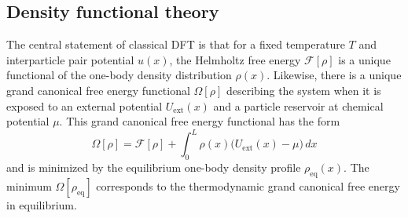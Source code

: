 \documentclass[aps,pre,twocolumn,superscriptaddress,nofootinbib]{revtex4}
\begin{document}
\subsection{Density functional theory}
The central statement of classical DFT is that for a fixed temperature $T$ and interparticle pair potential $u(x)$, the Helmholtz free energy $\mathcal{F}[\rho]$ is a unique functional of the one-body density distribution $\rho(x)$. 
Likewise, there is a unique grand canonical free energy functional $\Omega[\rho]$ describing the system when it is exposed to an external potential $U_\textrm{ext}(x)$ and a particle reservoir at chemical potential $\mu$.
This grand canonical free energy functional has the form \cite{Tarazona2008_incollection}
%
\begin{equation}
	\Omega[\rho] = \mathcal{F}[\rho] + \int_0^L \rho(x) \big( U_\textrm{ext}(x) - \mu \big) \, dx
	\label{Eq.DFT_grand_functional}
\end{equation}
%
and is minimized by the equilibrium one-body density profile $\rho_\textrm{eq}(x)$. 
The minimum $\Omega[\rho_\textrm{eq}]$ corresponds to the thermodynamic grand canonical free energy in equilibrium.
\end{document}
